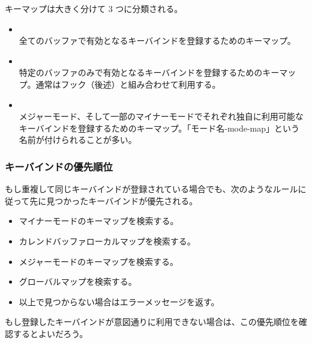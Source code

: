 キーマップは大きく分けて 3 つに分類される。
\begin{itemize}\setlength{\leftskip}{-1.00zw}%
\item {}                      \\
  全てのバッファで有効となるキーバインドを登録するためのキーマップ。
\item {} \\
  特定のバッファのみで有効となるキーバインドを登録するためのキーマップ。通常はフック（後述）と組み合わせて利用する。
\item {}                                \\
  メジャーモード、そして一部のマイナーモードでそれぞれ独自に利用可能なキーバインドを登録するためのキーマップ。「モード名-mode-map」という名前が付けられることが多い。
\end{itemize}
\subsubsection{キーバインドの優先順位}
もし重複して同じキーバインドが登録されている場合でも、次のようなルールに従って先に見つかったキーバインドが優先される。
\begin{itemize}\setlength{\leftskip}{-0.00zw}%
\item[\ajMaru{1}] マイナーモードのキーマップを検索する。
\item[\ajMaru{2}] カレンドバッファローカルマップを検索する。
\item[\ajMaru{3}] メジャーモードのキーマップを検索する。
\item[\ajMaru{4}] グローバルマップを検索する。
\item[\ajMaru{5}] 以上で見つからない場合はエラーメッセージを返す。
\end{itemize}
もし登録したキーバインドが意図通りに利用できない場合は、この優先順位を確認するとよいだろう。
